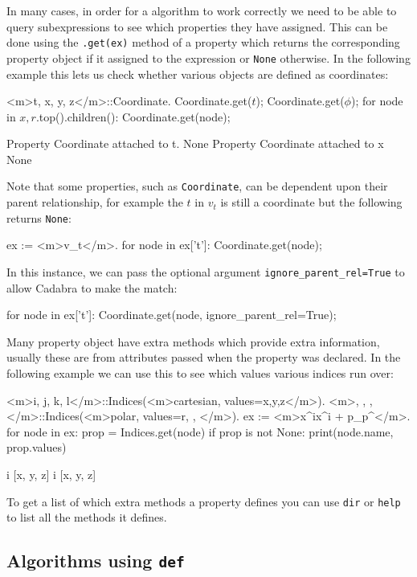 \documentclass{article}
\begin{document}
In many cases, in order for a algorithm to work correctly we need to be able to query subexpressions to see
which properties they have assigned. This can be done using the \texttt{.get(ex)} method of a property which
returns the corresponding property object if it assigned to the expression or \texttt{None} otherwise. In the
following example this lets us check whether various objects are defined as coordinates:
\begin{lstcdb}
	<m>{t, x, y, z}</m>::Coordinate.
	Coordinate.get($t$);
	Coordinate.get($\phi$);
	for node in $x, r$.top().children():
		Coordinate.get(node);
\end{lstcdb}
\begin{lstverb}
	Property Coordinate attached to t.
	None
	Property Coordinate attached to x
	None
\end{lstverb}
Note that some properties, such as \texttt{Coordinate}, can be dependent upon their parent relationship, for
example the $t$ in $v_t$ is still a coordinate but the following returns \texttt{None}:
\begin{lstcdb}
	ex := <m>v_{t}</m>.
	for node in ex['t']:
		Coordinate.get(node);
\end{lstcdb}
	In this instance, we can pass the optional argument \verb|ignore_parent_rel=True| to allow Cadabra to make the
	match:
\begin{lstcdb}
	for node in ex['t']:
		Coordinate.get(node, ignore_parent_rel=True);
\end{lstcdb}
Many property object have extra methods which provide extra information, usually these are from attributes
passed when the property was declared. In the following example we can use this to see which values various
indices run over:
\begin{lstcdb}
	<m>{i, j, k, l}</m>::Indices(<m>cartesian, values={x,y,z}</m>).
	<m>{\mu, \nu, \rho, \lambda}</m>::Indices(<m>polar, values={r, \phi, \theta}</m>).
	ex := <m>x^{i}x^{i} + p_{\mu}p^{\mu}</m>.
	for node in ex:
		prop = Indices.get(node)
		if prop is not None:
			print(node.name, prop.values)
\end{lstcdb}
\begin{lstverb}
	i [x, y, z]
	i [x, y, z]
\end{lstverb}
To get a list of which extra methods a property defines you can use \verb|dir| or \verb|help| to list all the
methods it defines.

\subsection{Algorithms using \texttt{def}}
\end{document}
